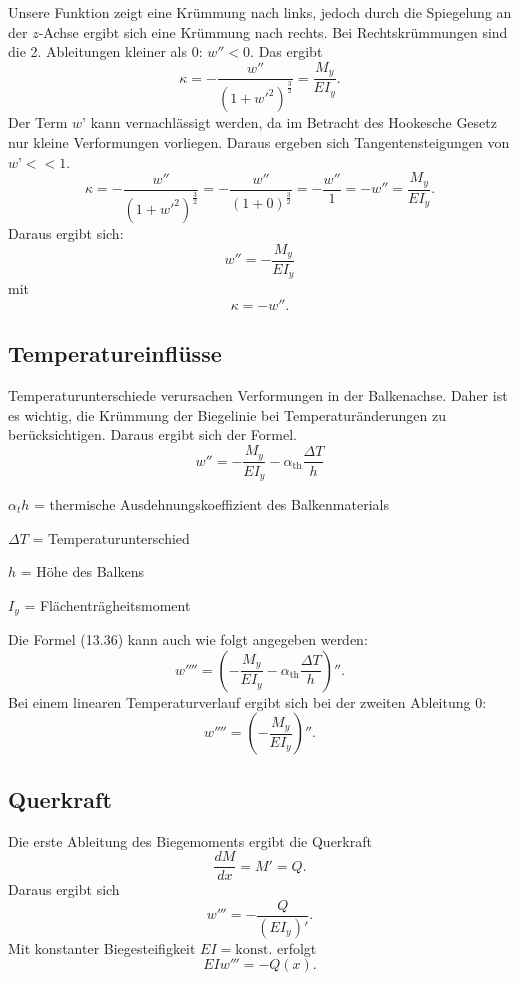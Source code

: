 Unsere Funktion zeigt eine Krümmung nach links, jedoch durch die Spiegelung an der $z$-Achse ergibt sich eine Krümmung nach rechts.
Bei Rechtskrümmungen sind die 2. Ableitungen kleiner als 0: $w'' < 0$.
Das ergibt
\begin{equation}
	\kappa=
	-\frac{w''}{\left(1+{w'}^2\right)^\frac{3}{2}}=
	\frac{M_y}{EI_y}.
\end{equation}
Der Term $w’$ kann vernachlässigt werden, da im Betracht des Hookesche Gesetz nur kleine Verformungen vorliegen.
Daraus ergeben sich Tangentensteigungen von $w’ << 1$.
\begin{equation}
	\kappa=
	-\frac{w''}{\left(1+{w'}^2\right)^\frac{3}{2}}=
	-\frac{w''}{\left(1+0\right)^\frac{3}{2}}=
	-\frac{w''}{1}=-w''=
	\frac{M_y}{EI_y}.
\end{equation}
Daraus ergibt sich:
\begin{equation}
	w''=
	-\frac{M_y}{EI_y}
\end{equation}
mit
\begin{equation}
	\kappa=
	-w''.
\end{equation}

\subsection{Temperatureinflüsse}
Temperaturunterschiede verursachen Verformungen in der Balkenachse.
Daher ist es wichtig, die Krümmung der Biegelinie bei Temperaturänderungen zu berücksichtigen.
Daraus ergibt sich der Formel.
\begin{equation}
	w''=
	-\frac{M_y}{EI_y}-\alpha_{\text{th}}\frac{\Delta T}{h}
\end{equation}

$α_th$ = thermische Ausdehnungskoeffizient des Balkenmaterials

$\Delta T$ = Temperaturunterschied

$h$ = Höhe des Balkens

$I_y$ = Flächenträgheitsmoment

Die Formel (13.36) kann auch wie folgt angegeben werden:
\begin{equation}
	w''''=
	\left(-\frac{M_y}{EI_y}-\alpha_{\text{th}}\frac{\Delta T}{h}\right)''.
\end{equation}
Bei einem linearen Temperaturverlauf ergibt sich bei der zweiten Ableitung 0:
\begin{equation}
	w''''=
	\left(-\frac{M_y}{EI_y}\right)''.
\end{equation}

\subsection{Querkraft}
Die erste Ableitung des Biegemoments ergibt die Querkraft
\begin{equation}
	\frac{dM}{dx}=
	M'=
	Q.
\end{equation}
Daraus ergibt sich
\begin{equation}
	w'''=
	-\frac{Q}{(EI_y)'}.
\end{equation}
Mit konstanter Biegesteifigkeit $EI = \text{konst}.$ erfolgt
\begin{equation}
	EIw'''=
	-Q\left(x\right).
\end{equation}

